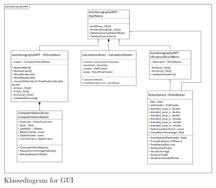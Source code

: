 \begin{figure}[H]
    \centering
    \includegraphics[width=1\textwidth]{figurer/d/Design/Class/uml_class_gui}
    \caption{Klassediagram for GUI}
    \label{class_gui}
\end{figure}
\newpage


